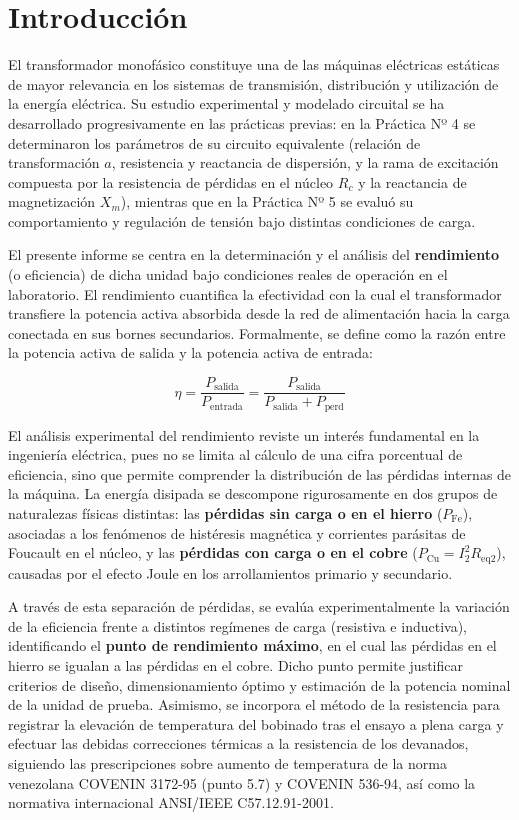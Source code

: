 \section{Introducción}

El transformador monofásico constituye una de las máquinas eléctricas estáticas de mayor relevancia en los sistemas de transmisión, distribución y utilización de la energía eléctrica. Su estudio experimental y modelado circuital se ha desarrollado progresivamente en las prácticas previas: en la Práctica Nº 4 se determinaron los parámetros de su circuito equivalente (relación de transformación $a$, resistencia y reactancia de dispersión, y la rama de excitación compuesta por la resistencia de pérdidas en el núcleo $R_c$ y la reactancia de magnetización $X_m$), mientras que en la Práctica Nº 5 se evaluó su comportamiento y regulación de tensión bajo distintas condiciones de carga.

El presente informe se centra en la determinación y el análisis del \textbf{rendimiento} (o eficiencia) de dicha unidad bajo condiciones reales de operación en el laboratorio. El rendimiento cuantifica la efectividad con la cual el transformador transfiere la potencia activa absorbida desde la red de alimentación hacia la carga conectada en sus bornes secundarios. Formalmente, se define como la razón entre la potencia activa de salida y la potencia activa de entrada:

\begin{equation}
    \eta = \frac{P_{\text{salida}}}{P_{\text{entrada}}} = \frac{P_{\text{salida}}}{P_{\text{salida}} + P_{\text{perd}}}
\end{equation}

El análisis experimental del rendimiento reviste un interés fundamental en la ingeniería eléctrica, pues no se limita al cálculo de una cifra porcentual de eficiencia, sino que permite comprender la distribución de las pérdidas internas de la máquina. La energía disipada se descompone rigurosamente en dos grupos de naturalezas físicas distintas: las \textbf{pérdidas sin carga o en el hierro} ($P_{\text{Fe}}$), asociadas a los fenómenos de histéresis magnética y corrientes parásitas de Foucault en el núcleo, y las \textbf{pérdidas con carga o en el cobre} ($P_{\text{Cu}} = I_2^2 R_{\text{eq2}}$), causadas por el efecto Joule en los arrollamientos primario y secundario.

A través de esta separación de pérdidas, se evalúa experimentalmente la variación de la eficiencia frente a distintos regímenes de carga (resistiva e inductiva), identificando el \textbf{punto de rendimiento máximo}, en el cual las pérdidas en el hierro se igualan a las pérdidas en el cobre. Dicho punto permite justificar criterios de diseño, dimensionamiento óptimo y estimación de la potencia nominal de la unidad de prueba. Asimismo, se incorpora el método de la resistencia para registrar la elevación de temperatura del bobinado tras el ensayo a plena carga y efectuar las debidas correcciones térmicas a la resistencia de los devanados, siguiendo las prescripciones sobre aumento de temperatura de la norma venezolana COVENIN 3172-95 (punto 5.7) y COVENIN 536-94, así como la normativa internacional ANSI/IEEE C57.12.91-2001.
